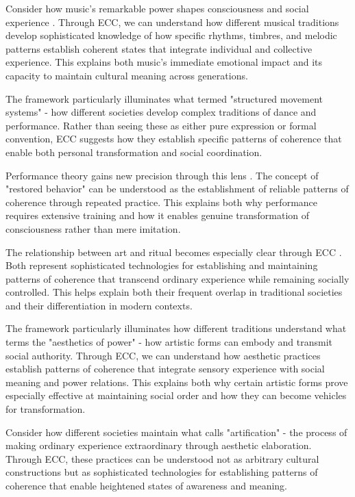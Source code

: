 Consider how music's remarkable power shapes consciousness and social experience \cite{feld1982sound}. Through ECC, we can understand how different musical traditions develop sophisticated knowledge of how specific rhythms, timbres, and melodic patterns establish coherent states that integrate individual and collective experience. This explains both music's immediate emotional impact and its capacity to maintain cultural meaning across generations.

The framework particularly illuminates what \cite{kaeppler1985structured} termed "structured movement systems" - how different societies develop complex traditions of dance and performance. Rather than seeing these as either pure expression or formal convention, ECC suggests how they establish specific patterns of coherence that enable both personal transformation and social coordination.

Performance theory gains new precision through this lens \cite{schechner1985between}. The concept of "restored behavior" can be understood as the establishment of reliable patterns of coherence through repeated practice. This explains both why performance requires extensive training and how it enables genuine transformation of consciousness rather than mere imitation.

The relationship between art and ritual becomes especially clear through ECC \cite{turner1982ritual}. Both represent sophisticated technologies for establishing and maintaining patterns of coherence that transcend ordinary experience while remaining socially controlled. This helps explain both their frequent overlap in traditional societies and their differentiation in modern contexts.

The framework particularly illuminates how different traditions understand what \cite{morphy1991ancestral} terms the "aesthetics of power" - how artistic forms can embody and transmit social authority. Through ECC, we can understand how aesthetic practices establish patterns of coherence that integrate sensory experience with social meaning and power relations. This explains both why certain artistic forms prove especially effective at maintaining social order and how they can become vehicles for transformation.

Consider how different societies maintain what \cite{dissanayake1992homo} calls "artification" - the process of making ordinary experience extraordinary through aesthetic elaboration. Through ECC, these practices can be understood not as arbitrary cultural constructions but as sophisticated technologies for establishing patterns of coherence that enable heightened states of awareness and meaning.

